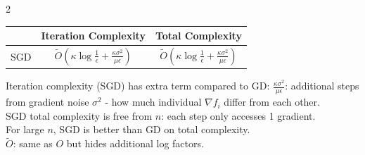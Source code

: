\documentclass[10pt]{article}
\begin{document}
\begin{multicols*}{2}

\begin{tabular}{|c|c|c|}
\hline
& Iteration Complexity & Total Complexity \\
\hline
SGD & $\tilde{O}\left(\kappa\log\frac{1}{\epsilon} + \frac{\kappa\sigma^2}{\mu\epsilon}\right)$ & $\tilde{O}\left(\kappa\log\frac{1}{\epsilon} + \frac{\kappa\sigma^2}{\mu\epsilon}\right)$ \\
\hline
\end{tabular}
Iteration complexity (SGD) has extra term compared to GD: $\frac{\kappa\sigma^2}{\mu\epsilon}$: additional steps from gradient noise $\sigma^2$ - how much individual $\nabla f_i$ differ from each other.\\
SGD total complexity is free from $n$: each step only accesses 1 gradient.\\
For large $n$, SGD is better than GD on total complexity.\\
$\tilde{O}$: same as $O$ but hides additional log factors.\\[\baselineskip]


\end{multicols*}
\end{document}
